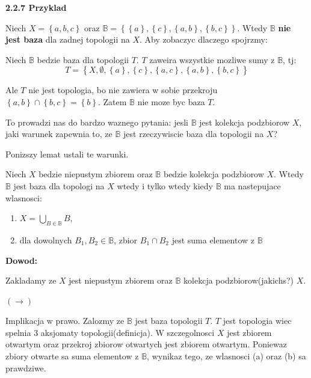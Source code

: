 \documentclass{article}
\begin{document}
\textbf{2.2.7 Przyklad}

Niech $X = \left\{ a,b,c \right\}$ oraz $\mathbb{B} = \left\{ \left\{ a \right\}, \left\{ c \right\}, \left\{ a,b \right\}, \left\{ b,c \right\}  \right\}$. Wtedy $\mathbb{B}$ \textbf{nie jest baza} dla zadnej topologii na $X$. Aby zobaczyc dlaczego spojrzmy:

Niech $\mathbb{B}$ bedzie baza dla topologii $T$. $T$ zaweira wszystkie mozliwe sumy z $\mathbb{B}$, tj:
$$T = \left\{X, \emptyset, \left\{ a \right\}, \left\{ c \right\}, \left\{ a,c \right\}, \left\{ a,b \right\}, \left\{ b,c \right\}    \right\}$$

Ale $T$ nie jest topologia, bo nie zawiera w sobie przekroju $\left\{ a,b \right\} \cap \left\{ b,c \right\} = \left\{ b \right\}$. Zatem $\mathbb{B}$ nie moze byc baza $T$.
\vspace{1cm}

To prowadzi nas do bardzo waznego pytania: jesli $\mathbb{B}$ jest kolekcja podzbiorow $X$, jaki warunek zapewnia to, ze $\mathbb{B}$ jest rzeczywiscie baza dla topologii na $X$?

Ponizszy lemat ustali te warunki.

\begin{tcolorbox}[colback=white!90!green,colframe=black!35!green,title=2.2.8 Lemat: Warunek na bycie baza]

    Niech $X$ bedzie niepustym zbiorem oraz $\mathbb{B}$ bedzie kolekcja podzbiorow $X$. Wtedy $\mathbb{B}$ jest baza dla topologi na $X$ wtedy i tylko wtedy kiedy $\mathbb{B}$ ma nastepujace wlasnosci:

    \begin{enumerate}[label=(\alph*)]
        \item $X = \bigcup\limits_{B \in \mathbb{B}}B$,
        \item dla dowolnych $B_{1}, B_{2} \in \mathbb{B}$, zbior $B_{1} \cap B_{2}$ jest suma elementow z $\mathbb{B}$

    \end{enumerate}

\end{tcolorbox}

\textbf{Dowod:}

Zakladamy ze $X$ jest niepustym zbiorem oraz $\mathbb{B}$ kolekcja podzbiorow(jakichs?) $X$.

$(\rightarrow)$

Implikacja w prawo. Zalozmy ze $\mathbb{B}$ jest baza topologii $T$. $T$ jest topologia wiec spelnia 3 aksjomaty topologii(definicja). W szczegolnosci $X$ jest zbiorem otwartym oraz przekroj zbiorow otwartych jest zbiorem otwartym. Poniewaz zbiory otwarte sa suma elementow z $\mathbb{B}$, wynikaz tego, ze wlasnosci (a) oraz (b) sa prawdziwe.
\end{document}
